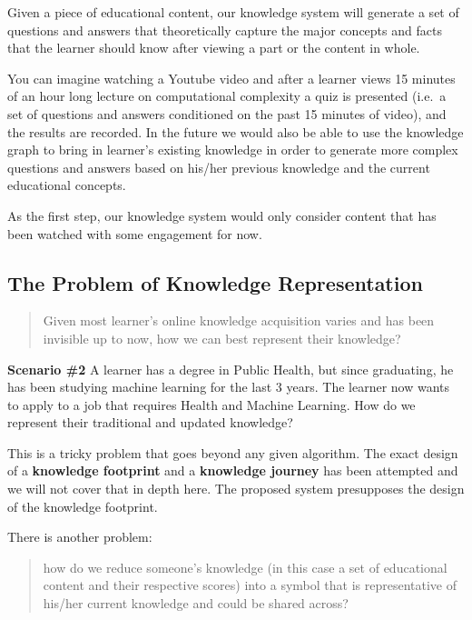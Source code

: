 \documentclass{acm_proc_article-sp}
\begin{document}
Given a piece of educational content, our knowledge system will generate
a set of questions and answers that theoretically capture the major
concepts and facts that the learner should know after viewing a part or
the content in whole.

You can imagine watching a Youtube video and after a learner views 15
minutes of an hour long lecture on computational complexity a quiz is
presented (i.e.~a set of questions and answers conditioned on the past
15 minutes of video), and the results are recorded. In the future we
would also be able to use the knowledge graph to bring in learner's
existing knowledge in order to generate more complex questions and
answers based on his/her previous knowledge and the current educational
concepts.

As the first step, our knowledge system would only consider content that
has been watched with some engagement for now.

\subsection{The Problem of Knowledge
Representation}\label{the-problem-of-knowledge-representation}

\begin{quote}
Given most learner's online knowledge acquisition varies and has been
invisible up to now, how we can best represent their knowledge?
\end{quote}

\textbf{Scenario \#2} A learner has a degree in Public Health, but since
graduating, he has been studying machine learning for the last 3 years.
The learner now wants to apply to a job that requires Health and Machine
Learning. How do we represent their traditional and updated knowledge?

This is a tricky problem that goes beyond any given algorithm. The exact
design of a \textbf{knowledge footprint} and a \textbf{knowledge
journey} has been attempted and we will not cover that in depth here.
The proposed system presupposes the design of the knowledge footprint.

There is another problem:

\begin{quote}
how do we reduce someone's knowledge (in this case a set of educational
content and their respective scores) into a symbol that is
representative of his/her current knowledge and could be shared across?
\end{quote}
\end{document}
